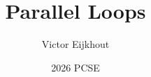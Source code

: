 \documentclass[10pt]{beamer}
\begin{document}
\author[Eijkhout]{Victor Eijkhout}
\date[2026]{2026 PCSE}
\title[loop]{Parallel Loops}
\maketitle


\end{document}
